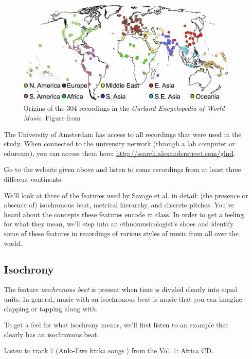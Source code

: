 \documentclass[a4paper, 9pt]{article}
\begin{document}
\begin{figure}
\center
\includegraphics[width=0.8\linewidth]{img/geo-distribution-garland}
\caption{Origins of the 304 recordings in the \textit{Garland Encyclopedia of World Music}. Figure from \cite{Savage2015}}
\label{fig:garland}
\end{figure}

The University of Amsterdam has access to all recordings that were used
in the study. When connected to the university network (through a lab
computer or eduroam), you can access them here:
\url{http://search.alexanderstreet.com/glnd}.

\begin{exercise}
\action Go to the website given above and listen to some recordings from at least three different continents. 
\end{exercise}

We'll look at three of the features used by Savage et al. in detail:
(the presence or absence of) isochronous beat, metrical hierarchy, and
discrete pitches. You've heard about the concepts these features encode
in class. In order to get a feeling for what they mean, we'll step into
an ethnomusicologist's shoes and identify some of these features in
recordings of various styles of music from all over the world.

\subsection{Isochrony}\label{isochrony}

The feature \emph{isochronous beat} is present when time is divided
clearly into equal units. In general, music with an isochronous beat is
music that you can imagine clapping or tapping along with.

To get a feel for what isochrony means, we'll first listen to an example
that clearly has an isochronous beat.

\begin{exercise}
\action Listen to track 7 (Anlo-Ewe kinka songs ) from the Vol. 1: Africa CD.
\end{exercise}
\end{document}
